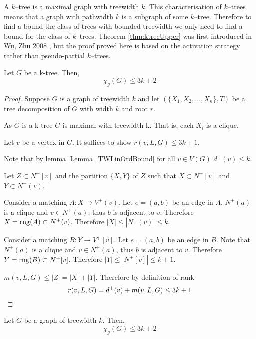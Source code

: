 
A $k$--tree is a maximal graph with treewidth $k$. This characterisation of $k$--trees means that a graph with pathwidth $k$ is a subgraph of some $k$--tree. Therefore to find a bound the class of trees with bounded treewidth we only need to find a bound for the class of $k$--trees. Theorem \ref{thm:ktreeUpper} was first introduced in Wu, Zhu 2008 \cite{WuZhu2008}, but the proof proved here is based on the activation strategy rather than pseudo-partial $k$--trees.
\begin{theorem} \label{thm:ktreeUpper}
        Let $G$ be a k-tree. Then, 
        \[\chi_g(G) \leq 3k + 2\]
\end{theorem}

\begin{proof}
    Suppose $G$ is a graph of treewidth $k$ and let $(\{X_1,X_2,\dots,X_n\},T)$ be a tree decomposition of $G$ with width $k$ and root $r$.
    
    As $G$ is a k-tree $G$ is maximal with treewidth k. That is, each $X_i$ is a clique.
    
    Let $v$ be a vertex in $G$. It suffices to show $r(v,L,G) \leq 3k + 1$.
    
    
    Note that by lemma \ref{Lemma_TWLinOrdBound} for all $v \in V(G)$ $d^+(v) \leq k$.
    
    Let $Z \subset N^-[v]$ and the partition $\{X,Y\}$ of $Z$ such that $X\subset N^-[v]$ and  $Y\subset N^-(v)$.
           
    Consider a matching $A\colon X \to V^+(v)$. Let $e=(a,b)$ be an edge in $A$.
    $N^+(a)$ is a clique and $v\in N^+(a)$, thus $b$ is adjacent to $v$. Therefore $X =\operatorname{rng}(A)\subset N^+(v)$. Therefore $|X| \leq |N^+(v)| \leq k$. 
    
    Consider a matching $B\colon Y \to V^+[v]$. Let $e=(a,b)$ be an edge in $B$.
    Note that $N^+(a)$ is a clique and $v\in N^+(a)$, thus $b$ is adjacent to $v$. Therefore $Y =\operatorname{rng}(B)\subset N^+[v]$. Therefore $|Y| \leq |N^+[v]| \leq k+1$. 
        
    $m(v,L,G) \leq |Z| = |X|+|Y|$. Therefore by definition of rank \[r(v,L,G) = d^+(v) + m(v,L,G) \leq 3k +1 \qedhere\]        
\end{proof}

\begin{corollary}
    Let $G$ be a graph of treewidth $k$. Then, 
    \[\chi_g(G) \leq 3k + 2\]
\end{corollary}

